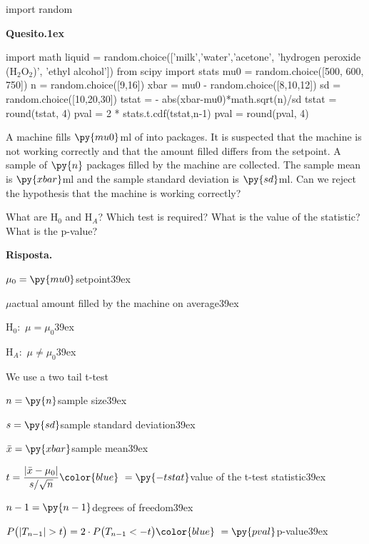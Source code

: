 \documentclass[11pt,twoside,a4paper]{article}
\newenvironment{question}{\par\textbf{Quesito.\kern1ex}}{\vspace{\parskip}}
\newenvironment{answer}{\par\textbf{Risposta.\hfill}}{}
\begin{document}
\begin{pycode}
import random
\end{pycode}

\begin{question}
\begin{pycode}
import math
liquid = random.choice(['milk','water','acetone', 'hydrogen peroxide (H$_2$O$_2$)', 'ethyl alcohol'])
from scipy import stats
mu0 = random.choice([500, 600, 750])
n = random.choice([9,16])
xbar = mu0 - random.choice([8,10,12])
sd = random.choice([10,20,30])
tstat = - abs(xbar-mu0)*math.sqrt(n)/sd
tstat = round(tstat, 4)
pval = 2 * stats.t.cdf(tstat,n-1)
pval = round(pval, 4)
\end{pycode}
A machine fills $\py{mu0}$ml of  into packages. It is suspected that the machine is not working correctly and that the amount filled differs from the setpoint. A sample of $\py{n}$ packages filled by the machine are collected. The sample mean is $\py{xbar}$ml and the sample standard deviation is $\py{sd}$ml. Can we reject the hypothesis that the machine is working correctly?

What are H$_0$ and H$_A$? Which test is required? What is the value of the statistic? What is the p-value?

\begin{answer}\parskip5pt

  $\mu_0 = \py{mu0}$\hfill setpoint\kern39ex
  
  $\mu$\hfill actual amount filled by the machine on average\kern39ex

  H$_0:$ $\mu = \mu_0$\kern39ex
  
  H$_A:$ $\mu\neq\mu_0$\kern39ex
  
  We use a two tail t-test
  
  $n = \py{n}$\hfill sample size\kern39ex
  
  $s = \py{sd}$\hfill sample standard deviation\kern39ex
  
  $\bar{x} = \py{xbar}$\hfill sample mean\kern39ex
  
  $t = \displaystyle\frac{|\bar{x}-\mu_0|}{s/\sqrt{n}}{\color{blue}\ = \py{-tstat}}$\hfill value of the t-test statistic\kern39ex
  
  $n-1 = \py{n-1}$\hfill degrees of freedom\kern39ex
  
  $P\big(|T_{n-1}|>t\big) = 2\cdot P\big(T_{n-1}<-t\big){\color{blue}\  = \py{pval}}$\hfill p-value\kern39ex

\end{answer}
\end{question}
\end{document}
